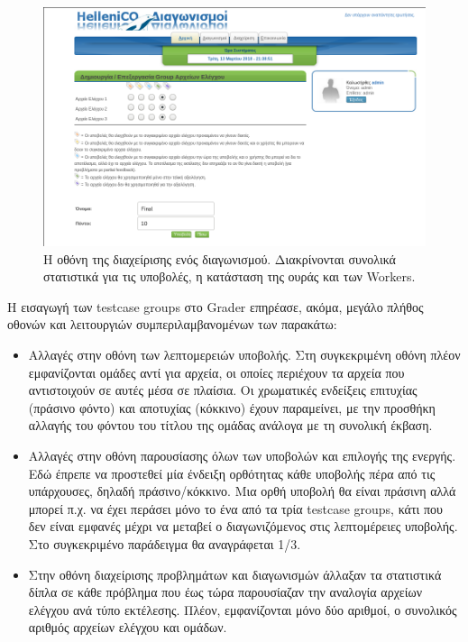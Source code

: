 \documentclass[diploma]{softlab-thesis}
\begin{document}
\begin{figure}
  \centering
  \includegraphics[scale=0.3,trim=4 4 4 4,clip]{Figures/groupedit.png}
  \caption[Οθόνη διαχείρισης προβλήματος]{Η οθόνη της διαχείρισης ενός διαγωνισμού.
  Διακρίνονται συνολικά στατιστικά για τις υποβολές, η κατάσταση της ουράς και των
  Workers.}
\end{figure}

\bigskip

Η εισαγωγή των testcase groups στο Grader επηρέασε, ακόμα, μεγάλο πλήθος οθονών
και λειτουργιών συμπεριλαμβανομένων των παρακάτω:

\begin{itemize}
    \item Αλλαγές στην οθόνη των λεπτομερειών υποβολής. Στη συγκεκριμένη
      οθόνη πλέον εμφανίζονται ομάδες αντί για αρχεία, οι οποίες περιέχουν
      τα αρχεία που αντιστοιχούν σε αυτές μέσα σε πλαίσια. Οι χρωματικές ενδείξεις
      επιτυχίας (πράσινο φόντο) και αποτυχίας (κόκκινο) έχουν παραμείνει, με την
      προσθήκη αλλαγής του φόντου του τίτλου της ομάδας ανάλογα με τη συνολική
      έκβαση.

    \item Αλλαγές στην οθόνη παρουσίασης όλων των υποβολών και επιλογής της ενεργής.
      Εδώ έπρεπε να προστεθεί μία ένδειξη ορθότητας κάθε υποβολής πέρα από τις
      υπάρχουσες, δηλαδή πράσινο/κόκκινο. Μια ορθή υποβολή θα είναι πράσινη αλλά
      μπορεί π.χ. να έχει περάσει μόνο το ένα από τα τρία testcase groups, κάτι
      που δεν είναι εμφανές μέχρι να μεταβεί ο διαγωνιζόμενος στις λεπτομέρειες
      υποβολής. Στο συγκεκριμένο παράδειγμα θα αναγράφεται 1/3.

    \item Στην οθόνη διαχείρισης προβλημάτων και διαγωνισμών άλλαξαν τα στατιστικά
      δίπλα σε κάθε πρόβλημα που έως τώρα παρουσίαζαν την αναλογία αρχείων ελέγχου
      ανά τύπο εκτέλεσης. Πλέον, εμφανίζονται μόνο δύο αριθμοί, ο συνολικός αριθμός
      αρχείων ελέγχου και ομάδων.

\end{itemize}
\end{document}
